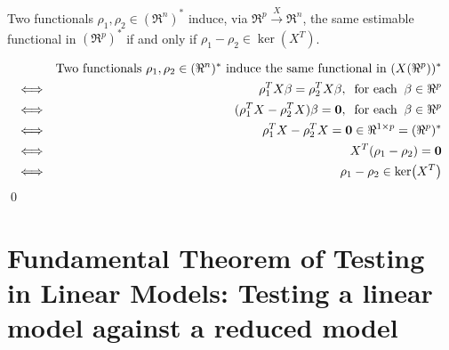 \documentclass{article}
\begin{document}
\begin{lemma}\quad
Two functionals $\rho_{1}, \rho_{2} \in (\Re^{n})^{*}$ induce, via $\Re^{p}\overset{X}{\longrightarrow}\Re^{n}$, the same estimable functional in $(\Re^{p})^{*}$ if and only if $\rho_{1} - \rho_{2} \in \ker\!\left(X^{T}\right)$.
\end{lemma}
\proof
\begin{eqnarray*}
&& \textnormal{Two functionals $\rho_{1}, \rho_{2} \in (\Re^{n})^{*}$ induce the same functional in $(X(\Re^{p}))^{*}$} \\
\Longleftrightarrow&& \rho_{1}^{T} X \beta = \rho_{2}^{T} X \beta, \;\;\textnormal{for each}\;\; \beta \in \Re^{p} \\
\Longleftrightarrow&& (\rho_{1}^{T} X - \rho_{2}^{T} X)\beta = \mathbf{0}, \;\;\textnormal{for each}\;\; \beta \in \Re^{p} \\
\Longleftrightarrow&& \rho_{1}^{T} X - \rho_{2}^{T} X = \mathbf{0} \in \Re^{1 \times p} = (\Re^{p})^{*} \\
\Longleftrightarrow&& X^{T}(\rho_{1} - \rho_{2}) = \mathbf{0} \\
\Longleftrightarrow&& \rho_{1} - \rho_{2} \in \ker\!\left(X^{T}\right)
\end{eqnarray*}
\qed


\newpage
\section{Fundamental Theorem of Testing in Linear Models: Testing a linear model against a reduced model}
\setcounter{theorem}{0}
\end{document}
